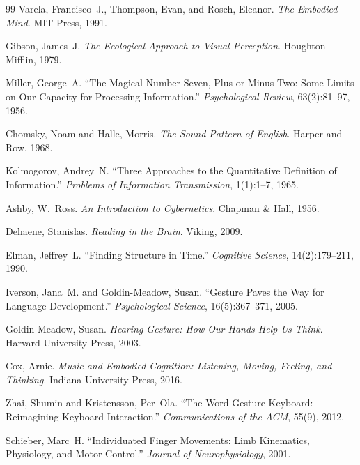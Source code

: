 \documentclass[12pt,a4paper]{article}
\theoremstyle{plain}
\theoremstyle{definition}
\theoremstyle{remark}
\begin{document}
\begin{thebibliography}{99}
Varela, Francisco~J., Thompson, Evan, and Rosch, Eleanor.
\textit{The Embodied Mind}.
MIT Press, 1991.

Gibson, James~J.
\textit{The Ecological Approach to Visual Perception}.
Houghton Mifflin, 1979.

Miller, George~A.
``The Magical Number Seven, Plus or Minus Two: Some Limits on Our Capacity
for Processing Information.''
\textit{Psychological Review}, 63(2):81--97, 1956.

Chomsky, Noam and Halle, Morris.
\textit{The Sound Pattern of English}.
Harper and Row, 1968.

Kolmogorov, Andrey~N.
``Three Approaches to the Quantitative Definition of Information.''
\textit{Problems of Information Transmission}, 1(1):1--7, 1965.

Ashby, W.~Ross.
\textit{An Introduction to Cybernetics}.
Chapman \& Hall, 1956.

Dehaene, Stanislas.
\textit{Reading in the Brain}.
Viking, 2009.

Elman, Jeffrey~L.
``Finding Structure in Time.''
\textit{Cognitive Science}, 14(2):179--211, 1990.

Iverson, Jana~M. and Goldin-Meadow, Susan.
``Gesture Paves the Way for Language Development.''
\textit{Psychological Science}, 16(5):367--371, 2005.

Goldin-Meadow, Susan.
\textit{Hearing Gesture: How Our Hands Help Us Think}.
Harvard University Press, 2003.

Cox, Arnie.
\textit{Music and Embodied Cognition: Listening, Moving, Feeling, and Thinking}.
Indiana University Press, 2016.

Zhai, Shumin and Kristensson, Per~Ola.
``The Word-Gesture Keyboard: Reimagining Keyboard Interaction.''
\textit{Communications of the ACM}, 55(9), 2012.

Schieber, Marc~H.
``Individuated Finger Movements: Limb Kinematics, Physiology, and Motor
Control.''
\textit{Journal of Neurophysiology}, 2001.

\end{thebibliography}
\end{document}
